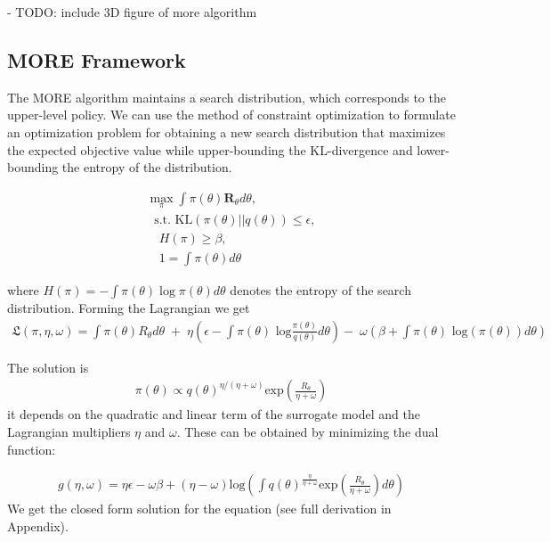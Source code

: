 - TODO: include 3D figure of more algorithm

\subsection{MORE Framework}
The MORE algorithm maintains a search distribution, which corresponds
to the upper-level policy.
We can use the method of constraint optimization
to formulate an optimization problem  for
obtaining a new search distribution that
maximizes the expected objective value while
upper-bounding the KL-divergence and
lower-bounding the entropy of the distribution.

\begin{equation}
  \label{more_opt}
  \begin{aligned}
    \max_{\pi} \int \pi(\theta) \mathbf{R}_{\theta} d\theta, \\
    \; \text{ s.t. KL}(\pi(\theta)||q(\theta)) \leq \epsilon, \\
    \quad H(\pi) \geq \beta, \\
    \quad 1 = \int \pi(\theta) d\theta
  \end{aligned}
\end{equation}

where $H(\pi) = - \int \pi(\theta) \log \pi(\theta) d\theta$ denotes
the entropy of the search distribution. 
Forming the Lagrangian we get
\begin{align} \mathfrak{L}(\pi, \eta, \omega) = 
\int \pi(\theta) R_{\theta} d\theta \; + \; 
\eta  \left(\epsilon - \int \pi(\theta) \text{ log}
 \frac{\pi(\theta)}{q(\theta)} d\theta\right)
 - \; \omega \left(\beta + \int \pi(\theta) \text{ log}(\pi(\theta)) d\theta\right)
\end{align}

The solution is
\begin{align}
\pi(\theta) \propto q(\theta)^{\eta/(\eta+\omega)} 
\text{exp}\left(\frac{R_\theta}{\eta + \omega}\right)
\end{align}
it depends on the quadratic and linear term of the surrogate model and the
Lagrangian multipliers
$\eta$ and $\omega$. These can be obtained by minimizing the dual function:

\begin{align}
  g(\eta,\omega) = \eta\epsilon - \omega\beta + (\eta - \omega) \text{log}
\left(\int q(\theta)^{\frac{\eta}{\eta + \omega}}
  \text{exp}\left(\frac{R_\theta}{\eta + \omega}\right) d\theta \right)
\end{align}
We get the closed form solution for the equation
(see full derivation in Appendix).

